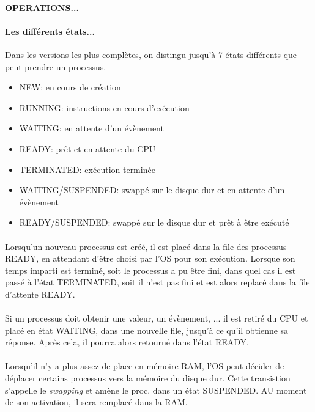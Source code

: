 {\paragraph{OPERATIONS...}

\paragraph{Les différents états...}
Dans les versions les plus complètes, on distingu jusqu'à 7 états différents que peut prendre un processus.
\begin{itemize}
\item NEW: en cours de création
\item RUNNING: instructions en cours d'exécution
\item WAITING: en attente d'un évènement
\item READY: prêt et en attente du CPU
\item TERMINATED: exécution terminée
\item WAITING/SUSPENDED: swappé sur le disque dur et en attente d'un évènement
\item READY/SUSPENDED: swappé sur le disque dur et prêt à être exécuté
\end{itemize}

\paragraph{}
Lorsqu'un nouveau processus est créé, il est placé dans la file des processus READY, en attendant d'être choisi par l'OS pour son exécution. Lorsque son temps imparti est terminé, soit le processus a pu être fini, dans quel cas il est passé à l'état TERMINATED, soit il n'est pas fini et est alors replacé dans la file d'attente READY.
\paragraph{}
Si un processus doit obtenir une valeur, un évènement, ... il est retiré du CPU et placé en état WAITING, dans une nouvelle file, jusqu'à ce qu'il obtienne sa réponse. Après cela, il pourra alors retourné dans l'état READY.
\paragraph{}
Lorsqu'il n'y a plus assez de place en mémoire RAM, l'OS peut décider de déplacer certains processus vers la mémoire du disque dur. Cette transistion s'appelle le \textit{swapping} et amène le proc. dans un état SUSPENDED. AU moment de son activation, il sera remplacé dans la RAM.
}


